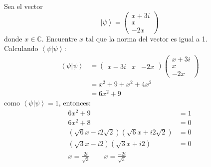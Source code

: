 \documentclass[12pt,letterpaper]{report}
\begin{document}
Sea el vector 
\begin{equation*}
    \left| \psi \right\rangle = \left(\begin{matrix}
        x+3i \\ x\\ -2x
    \end{matrix} \right)
\end{equation*}
donde $x\in \mathbb{C} $. Encuentre $x$ tal que la norma del vector es igual a 1.\\
Calculando $\left\langle \psi | \psi \right\rangle $:
\begin{align*}
    \left\langle \psi | \psi \right\rangle &= \left(\begin{matrix}
        x-3i & x & -2x
    \end{matrix} \right)\left(\begin{matrix}
        x+3i \\ x \\ -2x
    \end{matrix} \right)\\
    & = x^2+9+x^2+4x^2 \\
    & = 6x^2+9 
\end{align*}
como $\left\langle \psi | \psi \right\rangle=1$, entonces:
\begin{align*}
    6x^2+9&=1\\
    6x^2+8&=0\\
    \left(\sqrt{6}x-i2\sqrt{2}\right)\left(\sqrt{6}x+i2\sqrt{2}\right)&=0 \\
    \left(\sqrt{3}x-i2\right)\left(\sqrt{3}x+i2\right)&=0 \\
    x=\frac{2i}{\sqrt{3}} \qquad x=\frac{-2i}{\sqrt{3}}
\end{align*}
\end{document}
